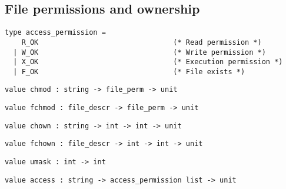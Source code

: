 \subsection*{File permissions and ownership }\begin{verbatim}
type access_permission =
    R_OK                                (* Read permission *)
  | W_OK                                (* Write permission *)
  | X_OK                                (* Execution permission *)
  | F_OK                                (* File exists *)
\end{verbatim}
\begin{comment}
 Flags for the \verbaccess call. 
\end{comment}
\begin{verbatim}
value chmod : string -> file_perm -> unit
\end{verbatim}
%
\begin{comment}
 Change the permissions of the named file. 
\end{comment}
\begin{verbatim}
value fchmod : file_descr -> file_perm -> unit
\end{verbatim}
%
\begin{comment}
 Change the permissions of an opened file. 
\end{comment}
\begin{verbatim}
value chown : string -> int -> int -> unit
\end{verbatim}
%
\begin{comment}
 Change the owner uid and owner gid of the named file. 
\end{comment}
\begin{verbatim}
value fchown : file_descr -> int -> int -> unit
\end{verbatim}
%
\begin{comment}
 Change the owner uid and owner gid of an opened file. 
\end{comment}
\begin{verbatim}
value umask : int -> int
\end{verbatim}
%
\begin{comment}
 Set the process creation mask, and return the previous mask. 
\end{comment}
\begin{verbatim}
value access : string -> access_permission list -> unit
\end{verbatim}
%
\begin{comment}
 Check that the process has the given permissions over the named
           file. Raise \verbUnix_error otherwise. 
\end{comment}
